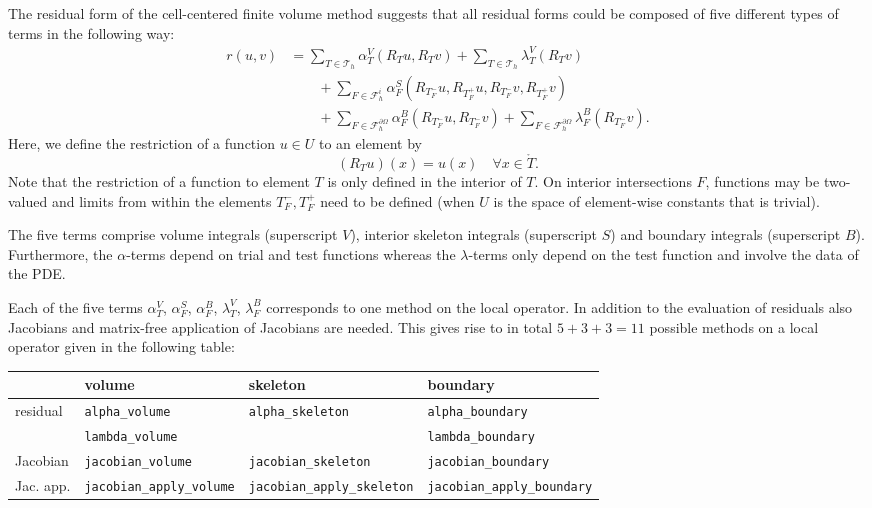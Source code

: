 \documentclass[a4paper,12pt]{article}
\begin{document}
The residual form of the cell-centered finite volume method suggests that
all residual forms could be composed of five different types of terms
in the following way:
\begin{equation}
\begin{split}
r(u,v) &=
\sum_{T\in\mathcal{T}_h} \alpha_T^V(R_T u, R_T v)
+ \sum_{T\in\mathcal{T}_h} \lambda_T^V(R_T v) \\
&\qquad+ \sum_{F\in\mathcal{F}_h^i} \alpha_F^S(R_{T_F^-} u,R_{T_F^+} u, R_{T_F^-} v, R_{T_F^+} v)\\
&\qquad+ \sum_{F\in\mathcal{F}_h^{\partial\Omega}} \alpha_F^B(R_{T_F^-} u, R_{T_F^-} v)
+ \sum_{F\in\mathcal{F}_h^{\partial\Omega}} \lambda_F^B(R_{T_F^-} v) .
\end{split}\label{eq:GeneralResidualForm}
\end{equation}
Here, we define the restriction
of a function $u\in U$ to an element by
\begin{equation*}
(R_T u)(x) = u(x) \quad \forall x\in\mathring{T} .
\end{equation*}
Note that the restriction of a function to element $T$ is only defined in
the interior of $T$. On interior intersections $F$, functions may be two-valued
and limits from within the elements $T_F^-, T_F^+$ need to be defined
(when $U$ is the space of element-wise constants that is trivial).

The five terms comprise volume integrals (superscript $V$), interior skeleton integrals
(superscript $S$) and boundary integrals (superscript $B$). Furthermore, the
$\alpha$-terms depend on trial and test functions whereas the $\lambda$-terms only
depend on the test function and involve the data of the PDE.

Each of the five terms $\alpha_T^V$, $\alpha_F^S$, $\alpha_F^B$,
$\lambda_T^V$, $\lambda_F^B$ corresponds to one method on the
local operator.
In addition to the evaluation of residuals also Jacobians and
matrix-free application of Jacobians are needed. This gives rise
to in total $5+3+3=11$ possible methods on a local operator given in the following table:
\begin{center}
\footnotesize
\begin{tabular}{l|l|l|l}
    & volume & skeleton & boundary \\
\hline
residual    & \lstinline!alpha_volume! & \lstinline!alpha_skeleton! & \lstinline!alpha_boundary! \\
                & \lstinline!lambda_volume! & & \lstinline!lambda_boundary! \\
\hline
Jacobian  & \lstinline!jacobian_volume! & \lstinline!jacobian_skeleton! & \lstinline!jacobian_boundary! \\
\hline
Jac.  app.  & \lstinline!jacobian_apply_volume! & \lstinline!jacobian_apply_skeleton! &
\lstinline!jacobian_apply_boundary!
\end{tabular}
\end{center}
\end{document}
